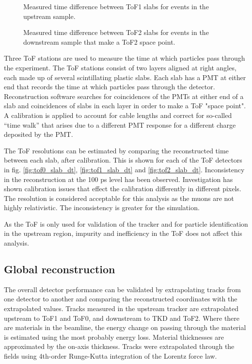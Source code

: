 \begin{figure}[!tbh]
    \centering
    {Measured time difference between ToF1 slabs for events in the upstream sample.}
\end{figure}

\begin{figure}[!tbh]
    \centering
    {Measured time difference between ToF2 slabs for events in the downstream sample that make a ToF2 space point.}
\end{figure}

Three ToF stations are used to measure the time at which particles pass through
the experiment. The ToF stations consist of two layers aligned at right angles,
each made up of several
scintillating plastic slabs. Each slab has a PMT at either end that records the
time at which particles pass through the detector. Reconstruction software
searches for coincidences of the PMTs at either end of a slab and coincidences
of slabs in each layer in order to make a ToF "space point". A calibration is
applied to account for cable lengths and correct for so-called ``time walk''
that arises due to a different PMT response for a different charge deposited by
the PMT.

The ToF resolutions can be estimated by comparing the reconstructed time 
between each slab, after calibration. This is shown for each of the ToF 
detectors in fig. \ref{fig:tof0_slab_dt}, \ref{fig:tof1_slab_dt} and
\ref{fig:tof2_slab_dt}. Inconsistency in the reconstruction at the 100 ps level
has been observed. Investigation has shown calibration issues that effect the 
calibration differently in different pixels. The resolution is considered 
acceptable for this analysis as the muons are not highly relativistic. The 
inconsistency is greater for the simulation.

As the ToF is only used for validation of the tracker and for particle 
identification in the upstream region, impurity and inefficiency in the ToF does 
not affect this analysis.

\clearpage

\subsection{Global reconstruction}

The overall detector performance can be validated by extrapolating tracks from
one detector to another and comparing the reconstructed coordinates with the 
extrapolated values. Tracks measured in
the upstream tracker are extrapolated upstream to ToF1 and ToF0, and downstream
to TKD and ToF2. Where there are materials in the beamline, the energy change on
passing through the material is estimated using the most probably energy loss. 
Material thicknesses are approximated by the on-axis thickness.  Tracks were
extrapolated through the fields using 4th-order Runge-Kutta integration of the 
Lorentz force law.

